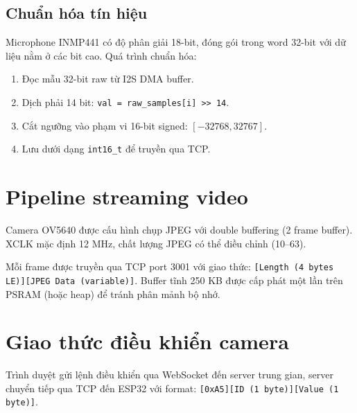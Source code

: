 \subsection{Chuẩn hóa tín hiệu}

Microphone INMP441 có độ phân giải 18-bit, đóng gói trong word 32-bit với dữ liệu
nằm ở các bit cao. Quá trình chuẩn hóa:

\begin{enumerate}
\item Đọc mẫu 32-bit raw từ I2S DMA buffer.
\item Dịch phải 14 bit: \texttt{val = raw\_samples[i] >> 14}.
\item Cắt ngưỡng vào phạm vi 16-bit signed: $[-32768, 32767]$.
\item Lưu dưới dạng \texttt{int16\_t} để truyền qua TCP.
\end{enumerate}

\section{Pipeline streaming video}

Camera OV5640 được cấu hình chụp JPEG với double buffering (2 frame buffer).
XCLK mặc định 12 MHz, chất lượng JPEG có thể điều chỉnh (10--63).

Mỗi frame được truyền qua TCP port 3001 với giao thức:
\texttt{[Length (4 bytes LE)][JPEG Data (variable)]}.
Buffer tĩnh 250 KB được cấp phát một lần trên PSRAM (hoặc heap) để tránh
phân mảnh bộ nhớ.

\section{Giao thức điều khiển camera}

Trình duyệt gửi lệnh điều khiển qua WebSocket đến server trung gian,
server chuyển tiếp qua TCP đến ESP32 với format:
\texttt{[0xA5][ID (1 byte)][Value (1 byte)]}.

